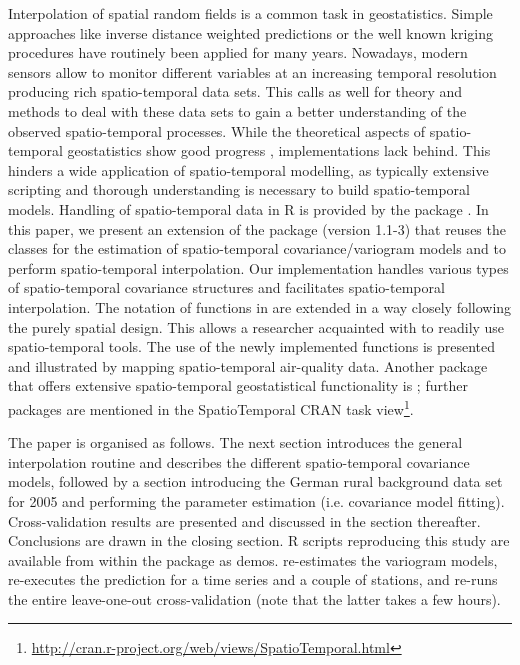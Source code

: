 Interpolation of spatial random fields is a common task in geostatistics. Simple approaches like inverse distance weighted predictions or the well known kriging procedures have routinely been applied for many years. Nowadays, modern sensors allow to monitor different variables at an increasing temporal resolution producing rich spatio-temporal data sets.
This calls as well for theory and methods to deal with these data sets to gain a better understanding of the observed spatio-temporal processes. While the theoretical aspects of spatio-temporal geostatistics show good progress \citep{Cressie2011}, implementations lack behind. This hinders a wide application of spatio-temporal modelling, as typically extensive scripting and thorough understanding is necessary to build spatio-temporal models. Handling of spatio-temporal data in R is provided by the  package \citep{Pebesma2012}. In this paper, we present an extension of the  package \citep{Pebesma2004} (version 1.1-3) that reuses the  classes for the estimation of spatio-temporal covariance/variogram models and to perform spatio-temporal interpolation. Our implementation handles various types of spatio-temporal covariance structures and facilitates spatio-temporal interpolation. The notation of functions in  are extended in a way closely following the purely spatial design. This allows a researcher acquainted with  to readily use spatio-temporal tools. The use of the newly implemented functions is presented and illustrated by mapping spatio-temporal air-quality data. Another package that offers extensive spatio-temporal geostatistical functionality is  \citep{Schlather2014}; further packages are mentioned in the SpatioTemporal CRAN task view\footnote{\url{http://cran.r-project.org/web/views/SpatioTemporal.html}}.

The paper is organised as follows. The next section introduces the general interpolation routine and describes the different spatio-temporal covariance models, followed by a section introducing the German rural background data set for 2005 and performing the parameter estimation (i.e. covariance model fitting). Cross-validation results are presented and discussed in the section thereafter. Conclusions are drawn in the closing section. R scripts reproducing this study are available from within the  package as demos.  re-estimates the variogram models,  re-executes the prediction for a time series and a couple of stations, and  re-runs the entire leave-one-out cross-validation (note that the latter takes a few hours).

